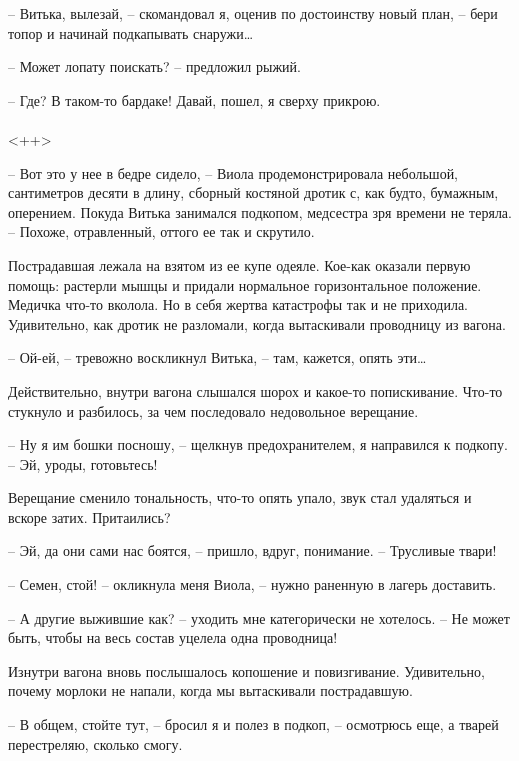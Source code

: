 \documentclass[a4paper]{book}
\begin{document}
-- Витька, вылезай, -- скомандовал я, оценив по достоинству новый план, -- бери топор и начинай подкапывать снаружи\ldots

-- Может лопату поискать? -- предложил рыжий.

-- Где? В таком-то бардаке! Давай, пошел, я сверху прикрою.

\paragraph{}<++>

-- Вот это у нее в бедре сидело, -- Виола продемонстрировала небольшой, сантиметров десяти в длину, сборный костяной дротик с, как будто, бумажным, оперением. Покуда Витька занимался подкопом, медсестра зря времени не теряла. -- Похоже, отравленный, оттого ее так и скрутило.

Пострадавшая лежала на взятом из ее купе одеяле. Кое-как оказали первую помощь: растерли мышцы и придали нормальное горизонтальное положение. Медичка что-то вколола. Но в себя жертва катастрофы так и не приходила. Удивительно, как дротик не разломали, когда вытаскивали проводницу из вагона. 

-- Ой-ей, -- тревожно воскликнул Витька, -- там, кажется, опять эти\ldots

Действительно, внутри вагона слышался шорох и какое-то попискивание. Что-то стукнуло и разбилось, за чем последовало недовольное верещание. 

-- Ну я им бошки посношу, -- щелкнув предохранителем, я направился к подкопу. -- Эй, уроды, готовьтесь!

Верещание сменило тональность, что-то опять упало, звук стал удаляться и вскоре затих. Притаились?

-- Эй, да они сами нас боятся, -- пришло, вдруг, понимание. -- Трусливые твари!

-- Семен, стой! -- окликнула меня Виола, -- нужно раненную в лагерь доставить. 


-- А другие выжившие как? -- уходить мне категорически не хотелось. -- Не может быть, чтобы на весь состав уцелела одна проводница! 

Изнутри вагона вновь послышалось копошение и повизгивание. Удивительно, почему морлоки не напали, когда мы вытаскивали пострадавшую.

-- В общем, стойте тут, -- бросил я и полез в подкоп, -- осмотрюсь еще, а тварей перестреляю, сколько смогу. 
\end{document}
